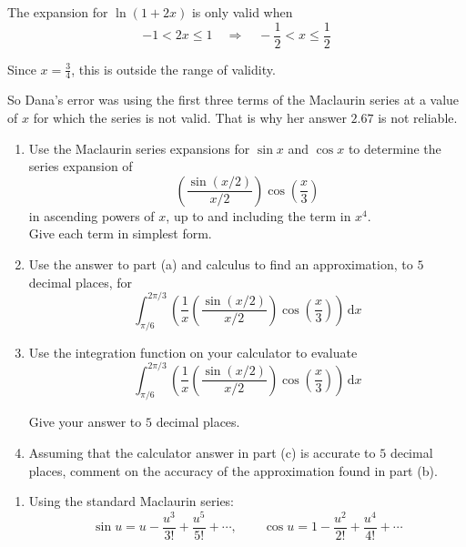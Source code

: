 \documentclass[leqno]{article}
\begin{document}
\begin{enumerate}[
  label=\textbf{\arabic*.},
  leftmargin=*,
  topsep=0pt,
  partopsep=0pt,
  parsep=0pt
]
\begin{djsSolution}
\begin{enumerate}[label=\textbf{(\alph*)}]
  The expansion for \(\ln(1+2x)\) is only valid when
  \[
  -1<2x\leq 1\quad\Longrightarrow\quad -\frac12<x\leq \frac12
  \]

  Since \(x=\frac34\), this is outside the range of validity.

  So Dana's error was using the first three terms of the Maclaurin series at a value of \(x\) for which the series is not valid. That is why her answer \(2.67\) is not reliable.
\end{enumerate}
\end{djsSolution}


\newpage

\questionitem

\begin{enumerate}[label=\textbf{(\alph*)}]
  \item Use the Maclaurin series expansions for $\sin x$ and $\cos x$ to determine the series expansion of
  \[
  \left(\frac{\sin(x/2)}{x/2}\right)\cos\left(\frac{x}{3}\right)
  \]
  in ascending powers of $x$, up to and including the term in $x^4$. \\

  Give each term in simplest form.  \\
  \item Use the answer to part (a) and calculus to find an approximation, to $5$ decimal places, for
  \[
  \int_{\pi/6}^{2\pi/3} \left( \frac{1}{x}\left(\frac{\sin(x/2)}{x/2}\right)\cos\left(\frac{x}{3}\right) \right) \, \mathrm{d}x
  \]
  \item Use the integration function on your calculator to evaluate
  \[
  \int_{\pi/6}^{2\pi/3} \left( \frac{1}{x}\left(\frac{\sin(x/2)}{x/2}\right)\cos\left(\frac{x}{3}\right) \right) \, \mathrm{d}x
  \]

  Give your answer to $5$ decimal places.  \\
  \item Assuming that the calculator answer in part (c) is accurate to $5$ decimal places, comment on the accuracy of the approximation found in part (b).  \\
\end{enumerate}

\vspace*{10pt}

\begin{djsSolution}
\begin{enumerate}[label=\textbf{(\alph*)}]
  \item Using the standard Maclaurin series:
\[
\sin u=u-\frac{u^3}{3!}+\frac{u^5}{5!}+\cdots,
\qquad
\cos u=1-\frac{u^2}{2!}+\frac{u^4}{4!}+\cdots
\]


\end{enumerate}
\end{djsSolution}
\end{enumerate}
\end{document}
